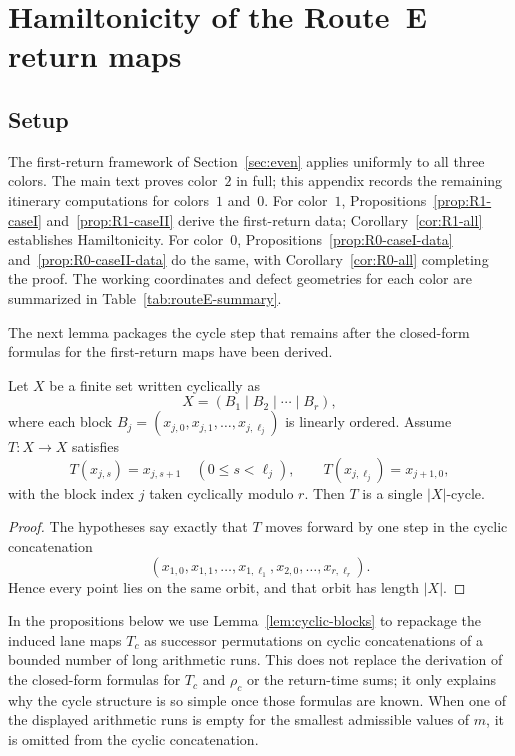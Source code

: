 \section{Hamiltonicity of the Route~E return maps}\label{app:routeE-cycle}

\subsection{Setup}

The first-return framework of Section~\ref{sec:even} applies uniformly to all three colors.
The main text proves color~$2$ in full; this appendix records the remaining itinerary computations for colors~$1$ and~$0$.
For color~$1$, Propositions~\ref{prop:R1-caseI} and~\ref{prop:R1-caseII} derive the first-return data; Corollary~\ref{cor:R1-all} establishes Hamiltonicity.
For color~$0$, Propositions~\ref{prop:R0-caseI-data} and~\ref{prop:R0-caseII-data} do the same, with Corollary~\ref{cor:R0-all} completing the proof.
The working coordinates and defect geometries for each color are summarized in Table~\ref{tab:routeE-summary}.

The next lemma packages the cycle step that remains after the closed-form formulas for the first-return maps have been derived.

\begin{lemma}\label{lem:cyclic-blocks}
Let $X$ be a finite set written cyclically as
\[
X=(B_1\mid B_2\mid \cdots \mid B_r),
\]
where each block $B_j=(x_{j,0},x_{j,1},\dots,x_{j,\ell_j})$ is linearly ordered.
Assume $T:X\to X$ satisfies
\[
T(x_{j,s})=x_{j,s+1}\quad (0\le s<\ell_j),
\qquad
T(x_{j,\ell_j})=x_{j+1,0},
\]
with the block index $j$ taken cyclically modulo $r$.
Then $T$ is a single $|X|$-cycle.
\end{lemma}

\begin{proof}
The hypotheses say exactly that $T$ moves forward by one step in the cyclic concatenation
\[
(x_{1,0},x_{1,1},\dots,x_{1,\ell_1},x_{2,0},\dots,x_{r,\ell_r}).
\]
Hence every point lies on the same orbit, and that orbit has length $|X|$.
\end{proof}

In the propositions below we use Lemma~\ref{lem:cyclic-blocks} to repackage the induced lane maps $T_c$ as successor permutations on cyclic concatenations of a bounded number of long arithmetic runs.
This does not replace the derivation of the closed-form formulas for $T_c$ and $\rho_c$ or the return-time sums; it only explains why the cycle structure is so simple once those formulas are known.
When one of the displayed arithmetic runs is empty for the smallest admissible values of $m$, it is omitted from the cyclic concatenation.

